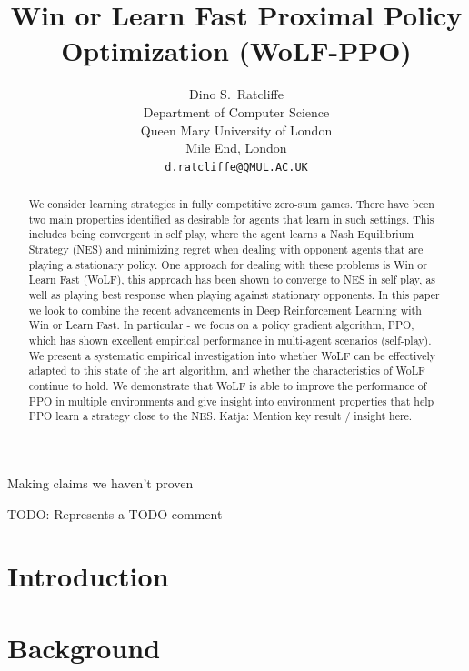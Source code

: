 \documentclass{article}
\title{Win or Learn Fast Proximal Policy Optimization (WoLF-PPO)}
\author{%
  Dino S.~Ratcliffe\\
  Department of Computer Science\\
  Queen Mary University of London\\
  Mile End, London \TODO{check proper address format} \\
  \texttt{d.ratcliffe@QMUL.AC.UK} \\
}
\newcommand\katja[1]{{\color{dark-cyan}Katja: #1}}
\newcommand\TODO[1]{{\color{red}TODO: #1}}
\newcommand\MAYBE[1]{{\color{blue} #1}}
\begin{document}
\maketitle

\MAYBE{Making claims we haven't proven}

\TODO{Represents a TODO comment}

\begin{abstract}
    We consider learning strategies in fully competitive zero-sum games. There have been two main properties identified as desirable for agents that learn in  such settings. This includes being convergent in self play, where the agent learns a Nash Equilibrium Strategy (NES) and minimizing regret when dealing with opponent agents that are playing a stationary policy. One approach for dealing with these problems is Win or Learn Fast (WoLF), this approach has been shown to converge to NES in self play, as well as playing best response when playing against stationary opponents. In this paper we look to combine the recent advancements in Deep Reinforcement Learning with Win or Learn Fast. In particular - we focus on a policy gradient algorithm, PPO, which has shown excellent empirical performance in multi-agent scenarios (self-play). We present a systematic empirical investigation into whether WoLF can be effectively adapted to this state of the art algorithm, and whether the characteristics of WoLF continue to hold. \MAYBE{We demonstrate that WoLF is able to improve the performance of PPO in multiple environments and give insight into environment properties that help PPO learn a strategy close to the NES.} \katja{Mention key result / insight here.}

\end{abstract}

\section{Introduction}

\section{Background}
\end{document}
